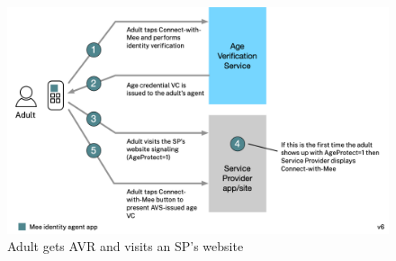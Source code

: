 \documentclass[11pt, oneside]{article}   	%
\begin{document}
\begin{figure}
	\includegraphics[width=\textwidth]{./images/adult.png}
	\caption{Adult gets AVR and visits an SP's website}
	\label{fig:adult}
\end{figure}
\end{document}
